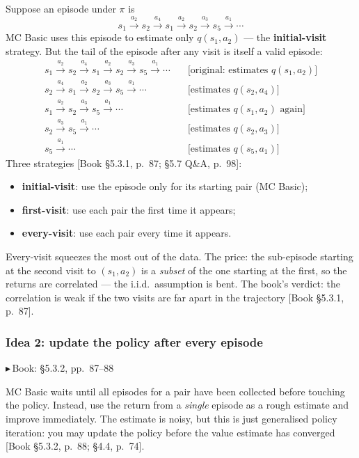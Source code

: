 \documentclass[11pt, letterpaper]{article}
\theoremstyle{runin}
\theoremstyle{runinplain}
\theoremstyle{remark}
\newcommand{\bk}[1]{{\color{bookblue}\small$\blacktriangleright$\,\textsf{Book: #1}}}
\newcommand{\bkin}[1]{{\color{bookblue}\small[\textsf{Book #1}]}}
\begin{document}
Suppose an episode under $\pi$ is
\[
  s_1\xrightarrow{a_2}s_2\xrightarrow{a_4}s_1\xrightarrow{a_2}s_2
  \xrightarrow{a_3}s_5\xrightarrow{a_1}\cdots
  \tag{5.3}
\]
MC Basic uses this episode to estimate only $q(s_1,a_2)$ --- the
\textbf{initial-visit} strategy. But the tail of the episode after any visit is
itself a valid episode:
\[
\begin{aligned}
  s_1\xrightarrow{a_2}s_2\xrightarrow{a_4}s_1\xrightarrow{a_2}s_2\xrightarrow{a_3}s_5\xrightarrow{a_1}\cdots
  &\quad\text{[original: estimates }q(s_1,a_2)]\\
  s_2\xrightarrow{a_4}s_1\xrightarrow{a_2}s_2\xrightarrow{a_3}s_5\xrightarrow{a_1}\cdots
  &\quad\text{[estimates }q(s_2,a_4)]\\
  s_1\xrightarrow{a_2}s_2\xrightarrow{a_3}s_5\xrightarrow{a_1}\cdots
  &\quad\text{[estimates }q(s_1,a_2)\text{ again]}\\
  s_2\xrightarrow{a_3}s_5\xrightarrow{a_1}\cdots
  &\quad\text{[estimates }q(s_2,a_3)]\\
  s_5\xrightarrow{a_1}\cdots
  &\quad\text{[estimates }q(s_5,a_1)]
\end{aligned}
\]
Three strategies \bkin{\S5.3.1, p.~87; \S5.7 Q\&A, p.~98}:
\begin{itemize}
  \item \textbf{initial-visit}: use the episode only for its starting pair (MC Basic);
  \item \textbf{first-visit}: use each pair the first time it appears;
  \item \textbf{every-visit}: use each pair every time it appears.
\end{itemize}
Every-visit squeezes the most out of the data. The price: the sub-episode starting
at the second visit to $(s_1,a_2)$ is a \emph{subset} of the one starting at the
first, so the returns are correlated --- the i.i.d.\ assumption is bent. The book's
verdict: the correlation is weak if the two visits are far apart in the trajectory
\bkin{\S5.3.1, p.~87}.

\subsubsection{Idea 2: update the policy after every episode}

\bk{\S5.3.2, pp.~87--88}

MC Basic waits until all episodes for a pair have been collected before touching
the policy. Instead, use the return from a \emph{single} episode as a rough
estimate and improve immediately. The estimate is noisy, but this is just
generalised policy iteration: you may update the policy before the value estimate
has converged \bkin{\S5.3.2, p.~88; \S4.4, p.~74}.
\end{document}
